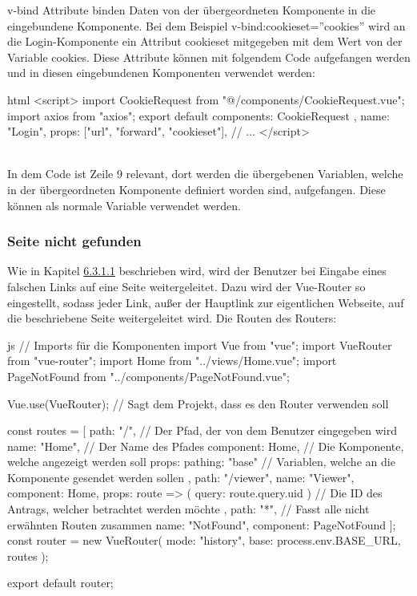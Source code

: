 v-bind Attribute binden Daten von der übergeordneten Komponente in die eingebundene Komponente. Bei dem Beispiel v-bind:cookieset=''cookies'' wird an die Login-Komponente ein Attribut cookieset mitgegeben mit dem Wert von der Variable cookies.
\newpage
Diese Attribute können mit folgendem Code aufgefangen werden und in diesen eingebundenen Komponenten verwendet werden:
\begin{code}{html}
<script>
	import CookieRequest from "@/components/CookieRequest.vue";
	import axios from "axios";
	export default {
		components: {
			CookieRequest
		},
		name: "Login",
		props: ["url", "forward", "cookieset"],
		// ...
	}
</script>
\end{code}
~\\
In dem Code ist Zeile 9 relevant, dort werden die übergebenen Variablen, welche in der übergeordneten Komponente definiert worden sind, aufgefangen. Diese können als normale Variable verwendet werden.
\newpage
\subsubsection{Seite nicht gefunden}
Wie in Kapitel \hyperref[sec:not_found]{6.3.1.1} beschrieben wird, wird der Benutzer bei Eingabe eines falschen Links auf eine Seite weitergeleitet. Dazu wird der Vue-Router so eingestellt, sodass jeder Link, außer der Hauptlink zur eigentlichen Webseite, auf die beschriebene Seite weitergeleitet wird. Die Routen des Routers:
\begin{code}{js}
// Imports für die Komponenten
import Vue from "vue";
import VueRouter from "vue-router";
import Home from "../views/Home.vue";
import PageNotFound from "../components/PageNotFound.vue";

Vue.use(VueRouter);		// Sagt dem Projekt, dass es den Router verwenden soll

const routes = [
{
	path: "/",					// Der Pfad, der von dem Benutzer eingegeben wird
	name: "Home",				// Der Name des Pfades
	component: Home,			// Die Komponente, welche angezeigt werden soll
	props: { pathing: "base" }	// Variablen, welche an die Komponente gesendet werden sollen
},
{
	path: "/viewer",
	name: "Viewer",
	component: Home,
	props: route => ({ query: route.query.uid })	// Die ID des Antrags, welcher betrachtet werden möchte
},
{
	path: "*",				// Fasst alle nicht erwähnten Routen zusammen
	name: "NotFound",
	component: PageNotFound
}
];
const router = new VueRouter({
	mode: "history",
	base: process.env.BASE_URL,
	routes
});

export default router;
\end{code}
~\\

